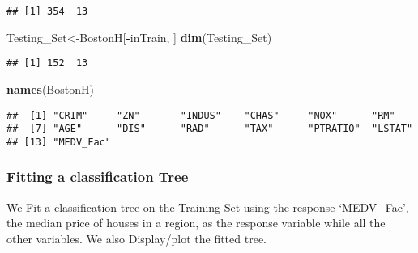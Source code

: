 \documentclass[
]{article}
\newenvironment{Shaded}{\begin{snugshade}}{\end{snugshade}}
\newcommand{\FunctionTok}[1]{\textcolor[rgb]{0.13,0.29,0.53}{\textbf{#1}}}
\newcommand{\NormalTok}[1]{#1}
\newcommand{\OtherTok}[1]{\textcolor[rgb]{0.56,0.35,0.01}{#1}}
\newcommand{\SpecialCharTok}[1]{\textcolor[rgb]{0.81,0.36,0.00}{\textbf{#1}}}
\begin{document}
\begin{verbatim}
## [1] 354  13
\end{verbatim}

\begin{Shaded}
\begin{Highlighting}[]
\NormalTok{  Testing\_Set}\OtherTok{\textless{}{-}}\NormalTok{BostonH[}\SpecialCharTok{{-}}\NormalTok{inTrain, ]}
  \FunctionTok{dim}\NormalTok{(Testing\_Set)}
\end{Highlighting}
\end{Shaded}

\begin{verbatim}
## [1] 152  13
\end{verbatim}

\begin{Shaded}
\begin{Highlighting}[]
  \FunctionTok{names}\NormalTok{(BostonH)}
\end{Highlighting}
\end{Shaded}

\begin{verbatim}
##  [1] "CRIM"     "ZN"       "INDUS"    "CHAS"     "NOX"      "RM"      
##  [7] "AGE"      "DIS"      "RAD"      "TAX"      "PTRATIO"  "LSTAT"   
## [13] "MEDV_Fac"
\end{verbatim}

\hypertarget{fitting-a-classification-tree}{%
\subsubsection{Fitting a classification
Tree}\label{fitting-a-classification-tree}}

We Fit a classification tree on the Training Set using the response
`MEDV\_Fac', the median price of houses in a region, as the response
variable while all the other variables. We also Display/plot the fitted
tree.
\end{document}
